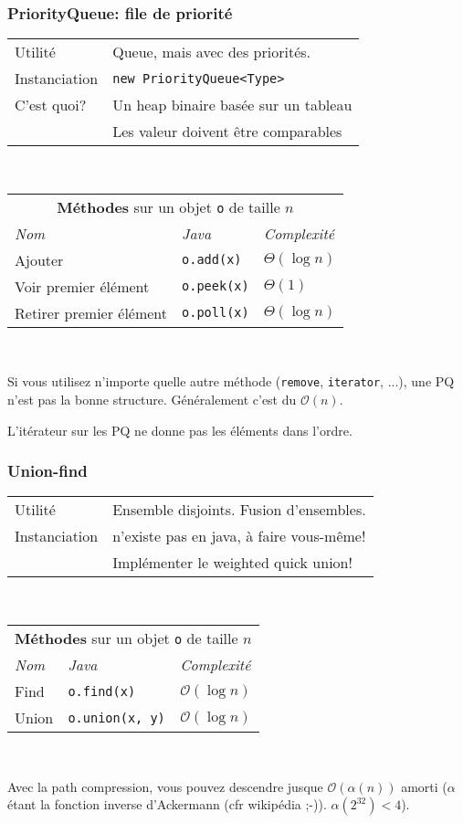 \documentclass[8pt,aspectratio=169]{beamer}
\begin{document}
\begin{frame}
\frametitle{PriorityQueue: file de priorité}
\centering
\begin{tabular}{ll}
	Utilité & Queue, mais avec des priorités.\\
	Instanciation & \texttt{new PriorityQueue<Type>}\\
	C'est quoi? & Un heap binaire basée sur un tableau\\
	& \color{red} Les valeur doivent être comparables
	
\end{tabular}\\
\vspace{0.5cm}
\centering
\begin{tabular}{lll}
	\multicolumn{3}{c}{\textbf{Méthodes} sur un objet \texttt{o} de taille $n$} \\
	\textit{Nom} & \textit{Java} & \textit{Complexité} \\
	Ajouter & \texttt{o.add(x)} & $\Theta(\log n)$\\
	Voir premier élément & \texttt{o.peek(x)} & $\Theta(1)$\\
	Retirer premier élément & \texttt{o.poll(x)} & $\Theta(\log n)$
\end{tabular}\\
\vspace{0.5cm}

\color{red} Si vous utilisez n'importe quelle autre méthode (\texttt{remove}, \texttt{iterator}, ...), une PQ n'est pas la bonne structure. Généralement c'est du $\mathcal{O}(n)$.

\color{red} L'itérateur sur les PQ ne donne pas les éléments dans l'ordre.
\end{frame}

\begin{frame}
\frametitle{Union-find}
\centering
\begin{tabular}{ll}
	Utilité & Ensemble disjoints. Fusion d'ensembles.\\
	Instanciation & n'existe pas en java, à faire vous-même!\\
	& \color{red} Implémenter le weighted quick union!
	
\end{tabular}\\
\vspace{0.5cm}
\centering
\begin{tabular}{lll}
	\multicolumn{3}{c}{\textbf{Méthodes} sur un objet \texttt{o} de taille $n$} \\
	\textit{Nom} & \textit{Java} & \textit{Complexité} \\
	Find & \texttt{o.find(x)} & $\mathcal{O}(\log n)$\\
	Union & \texttt{o.union(x, y)} & $\mathcal{O}(\log n)$
\end{tabular}\\
\vspace{0.5cm}

\color{blue} Avec la path compression, vous pouvez descendre jusque $\mathcal{O}(\alpha(n))$ amorti ($\alpha$ étant la fonction inverse d'Ackermann (cfr wikipédia ;-)). $\alpha(2^{32}) < 4$).
\end{frame}
\end{document}
